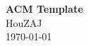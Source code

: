\documentclass[12pt,a4paper]{article}
\begin{document}
\begin{titlepage}
\begin{center}

\vspace*{6.5cm}

\textbf{\Huge{ACM Template}} \\ [1.5cm]

\large{HouZAJ} \\ [0.2cm]
\today
\end{center}
\clearpage

\tableofcontents
\pagestyle{empty}
\clearpage
\end{titlepage}


\end{document}
